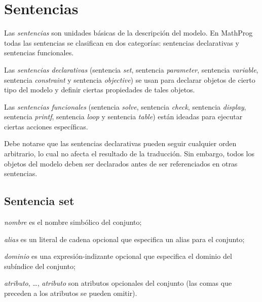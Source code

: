 \documentclass[11pt,spanish]{report}
\def\para#1{\noindent{\bf#1}}
\begin{document}
\chapter{Sentencias}

Las {\it sentencias} son unidades básicas de la descripción del modelo. En MathProg todas las sentencias se clasifican en dos categorías: sentencias declarativas y sentencias funcionales.

Las {\it sentencias declarativas} (sentencia {\it set}, sentencia {\it parameter}, sentencia {\it variable}, sentencia {\it constraint} y sentencia {\it objective}) se usan para declarar objetos de cierto tipo del modelo y definir ciertas propiedades de tales objetos.

Las {\it sentencias funcionales} (sentencia {\it solve}, sentencia {\it check}, sentencia {\it display}, sentencia {\it printf}, sentencia {\it loop} y sentencia {\it table}) están ideadas para ejecutar ciertas acciones específicas.

Debe notarse que las sentencias declarativas pueden seguir cualquier orden arbitrario, lo cual no afecta el resultado de la traducción. Sin embargo, todos los objetos del modelo deben ser declarados antes de ser referenciados en otras sentencias.

\section{Sentencia set}

\noindent
{}

\medskip

\noindent
{\it nombre} es el nombre simbólico del conjunto;

\noindent
{\it alias} es un literal de cadena opcional que especifica un alias para el conjunto;

\noindent
{\it dominio} es una expresión-indizante opcional que especifica el dominio del subíndice del conjunto;

\noindent
{\it atributo}, \dots, {\it atributo} son atributos opcionales del conjunto (las comas que preceden a los atributos se pueden omitir).

\para{Atributos opcionales}

\vspace*{-8pt}
\end{document}
